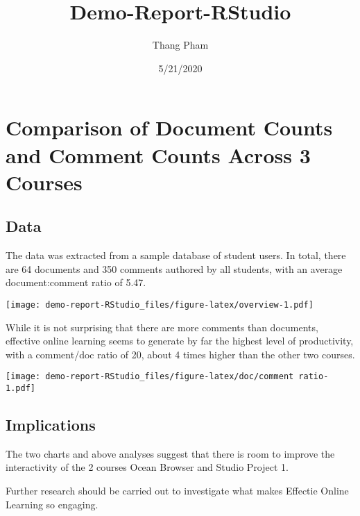 \documentclass[
]{article}
\title{Demo-Report-RStudio}
\author{Thang Pham}
\date{5/21/2020}
\begin{document}
\maketitle

\hypertarget{comparison-of-document-counts-and-comment-counts-across-3-courses}{%
\section{Comparison of Document Counts and Comment Counts Across 3
Courses}\label{comparison-of-document-counts-and-comment-counts-across-3-courses}}

\hypertarget{data}{%
\subsection{Data}\label{data}}

The data was extracted from a sample database of student users. In
total, there are 64 documents and 350 comments authored by all students,
with an average document:comment ratio of 5.47.

\texttt{[image: demo-report-RStudio\_files/figure-latex/overview-1.pdf]}

While it is not surprising that there are more comments than documents,
effective online learning seems to generate by far the highest level of
productivity, with a comment/doc ratio of 20, about 4 times higher than
the other two courses.

\texttt{[image: demo-report-RStudio\_files/figure-latex/doc/comment ratio-1.pdf]}

\hypertarget{implications}{%
\subsection{Implications}\label{implications}}

The two charts and above analyses suggest that there is room to improve
the interactivity of the 2 courses Ocean Browser and Studio Project 1.

Further research should be carried out to investigate what makes
Effectie Online Learning so engaging.
\end{document}
